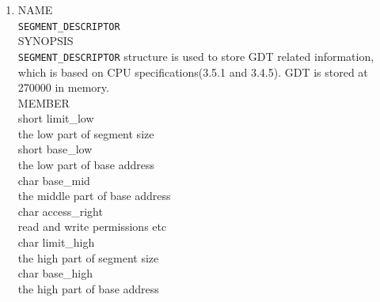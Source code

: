 \documentclass{swfcthesis}
\begin{document}
\begin{enumerate}
  \item
  NAME \\
  \hspace*{1cm}\texttt{SEGMENT\_DESCRIPTOR} \\
  SYNOPSIS \\
  \hspace*{1cm} \texttt{SEGMENT\_DESCRIPTOR} structure is
used to store GDT related information, which is based on CPU specifications(3.5.1 and
3.4.5\cite{intel_3a}). GDT is stored at 270000 in memory. \\
  MEMBER \\
  \hspace*{1cm} short limit\_low\\
  \hspace*{1.5cm}  the low part of segment size\\ 
  \hspace*{1cm} short base\_low\\
  \hspace*{1.5cm} the low part of base address\\
  \hspace*{1cm} char base\_mid\\
  \hspace*{1.5cm} the middle part of base address\\
  \hspace*{1cm} char access\_right\\
  \hspace*{1.5cm} read and write permissions etc\\
  \hspace*{1cm} char  limit\_high\\
  \hspace*{1.5cm} the high part of segment size\\
  \hspace*{1cm} char base\_high\\
  \hspace*{1.5cm}  the high part of base address\\


\end{enumerate}
\end{document}
